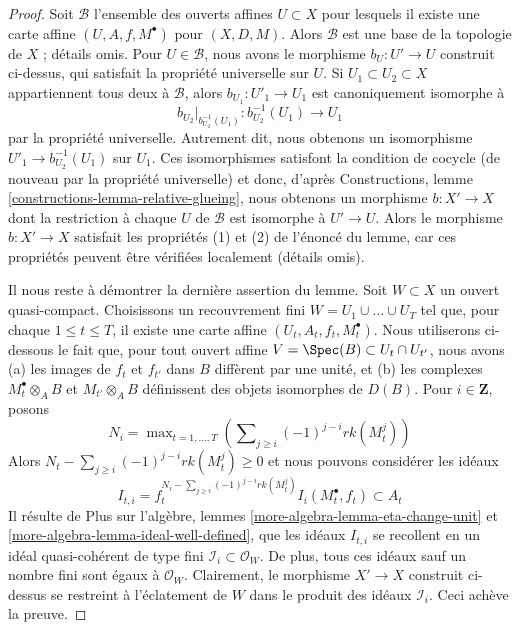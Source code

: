 \begin{proof}
\medskip\noindent
Soit $\mathcal{B}$ l'ensemble des ouverts affines $U \subset X$
pour lesquels il existe une carte affine $(U, A, f, M^\bullet)$
pour $(X, D, M)$. Alors $\mathcal{B}$ est une base de la topologie
de $X$ ; détails omis. Pour $U \in \mathcal{B}$, nous avons
le morphisme $b_U : U' \to U$ construit ci-dessus, qui satisfait
la propriété universelle sur $U$. Si $U_1 \subset U_2 \subset X$
appartiennent tous deux à $\mathcal{B}$, alors $b_{U_1} : U'_1 \to U_1$
est canoniquement isomorphe à
$$
b_{U_2}|_{b_{U_2}^{-1}(U_1)} : b_{U_2}^{-1}(U_1) \longrightarrow U_1
$$
par la propriété universelle. Autrement dit, nous obtenons un isomorphisme
$U'_1 \to b_{U_2}^{-1}(U_1)$ sur $U_1$. Ces isomorphismes satisfont
la condition de cocycle (de nouveau par la propriété universelle) et donc, d'après
Constructions, lemme \ref{constructions-lemma-relative-glueing},
nous obtenons un morphisme $b : X' \to X$ dont la restriction à chaque
$U$ de $\mathcal{B}$ est isomorphe à $U' \to U$.
Alors le morphisme $b : X' \to X$ satisfait les propriétés (1) et (2)
de l'énoncé du lemme, car ces propriétés peuvent être vérifiées
localement (détails omis).

\medskip\noindent
Il nous reste à démontrer la dernière assertion du lemme.
Soit $W \subset X$ un ouvert quasi-compact.
Choisissons un recouvrement fini $W = U_1 \cup \ldots \cup U_T$
tel que, pour chaque $1 \leq t \leq T$, il existe une carte affine
$(U_t, A_t, f_t, M_t^\bullet)$. Nous utiliserons ci-dessous le fait que, pour tout
ouvert affine $V = \Spec(B) \subset U_t \cap U_{t'}$, nous avons
(a) les images de $f_t$ et $f_{t'}$ dans $B$ diffèrent par une unité, et
(b) les complexes $M_t^\bullet \otimes_A B$ et $M_{t'} \otimes_A B$
définissent des objets isomorphes de $D(B)$. Pour $i \in \mathbf{Z}$, posons
$$
N_i = \max\nolimits_{t = 1, \ldots, T}
\left(\sum\nolimits_{j \geq i} (-1)^{j - i} rk(M_t^j)\right)
$$
Alors $N_t - \sum\nolimits_{j \geq i} (-1)^{j - i} rk(M_t^j) \geq 0$
et nous pouvons considérer les idéaux
$$
I_{t, i} =
f_t^{N_i - \sum\nolimits_{j \geq i} (-1)^{j - i} rk(M_t^j)}
I_i(M_t^\bullet, f_t)
\subset A_t
$$
Il résulte de Plus sur l'algèbre, lemmes
\ref{more-algebra-lemma-eta-change-unit} et
\ref{more-algebra-lemma-ideal-well-defined},
que les idéaux $I_{t, i}$ se recollent en un idéal quasi-cohérent de type fini
$\mathcal{I}_i \subset \mathcal{O}_W$. De plus, tous ces idéaux sauf
un nombre fini sont égaux à $\mathcal{O}_W$.
Clairement, le morphisme $X' \to X$ construit ci-dessus
se restreint à l'éclatement de $W$ dans le produit
des idéaux $\mathcal{I}_i$. Ceci achève la preuve.
\end{proof}

